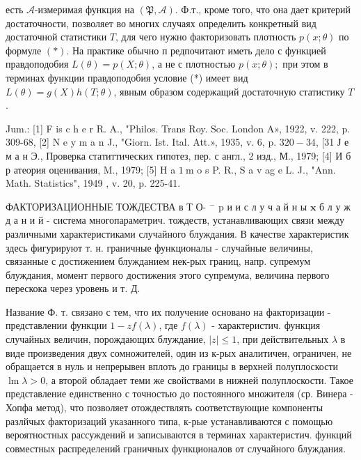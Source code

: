 \documentclass[10pt]{article}
\begin{document}
есть $\mathcal{A}$-измеримая функция на $(\mathfrak{P}, \mathcal{A})$. Ф.т., кроме того, что она дает критерий достаточности, позволяет во многих случаях определить конкретный вид достаточной статистики $T$, для чего нужно факторизовать плотность $p(x ; \theta)$ по формуле $(*)$. На практике обычно п редпочитают иметь дело с функцией правдоподобия $L(\theta)=p(X ; \theta)$, а не с плотностью $p(x ; \theta) ;$ при этом в терминах функции правдоподобия условие (*) имеет вид $L(\theta)=g(X) h(T ; \theta)$, явным образом содержащий достаточную статистику $T$.



Jum.: [1] F is c h e r R. A., "Philos. Trans Roy. Soc. London A», 1922, v. 222, p. 309-68, [2] N e y m a n J., "Giorn. Ist. Ital. Att.», 1935, v. 6, p. $320-34$, [31 Ј е м а н Э., Проверка статиттических гипотез, пер. с англ., 2 изд., М., 1979; [4] И б р атеория оценивания, M., 1979; [5] H a $1 \mathrm{~m}$ o s P. R., S a v ag e L. J., "Ann. Math. Statistics", 1949 , v. 20, p. 225-41.



ФАКТОРИЗАЦИОННЫЕ ТОЖДЕСТВА в Т О- $^{-}$ $\mathrm{p}$ и и с л у ч а й н ы $\mathbf{x}$ б л у ж д а н и й - система многопараметрич. тождеств, устанавливающих связи между различными характеристиками случайного блуждания. В качестве характеристик здесь фигурируют т. н. граничные функционалы - случайные величины, связанные с достижением блужданием нек-рых границ, напр. супремум блуждания, момент первого достижения этого супремума, величина первого перескока через уровень и т. Д.



Название Ф. т. связано с тем, что их получение основано на факторизации - представлении функции $1-z f(\lambda)$, где $f(\lambda)$ - характеристич. функция случайных величин, порождающих блуждание, $|z| \leqslant 1$, при действительных $\lambda$ в виде произведения двух сомножителей, один из к-рых аналитичен, ограничен, не обращается в нуль и непрерывен вплоть до границы в верхней полуплоскости $\operatorname{lm} \lambda>0$, а второй обладает теми же свойствами в нижней полуплоскости. Такое представление единственно с точностью до постоянного множителя (ср. Винера - Хопфа метод), что позволяет отождествлять соответствующие компоненты разлйчых факторизаций указанного типа, к-рые устанавливаются с помощью вероятностных рассуждений и записываются в терминах характеристич. функций совместных распределений граничных функционалов от случайного блуждания.
\end{document}
